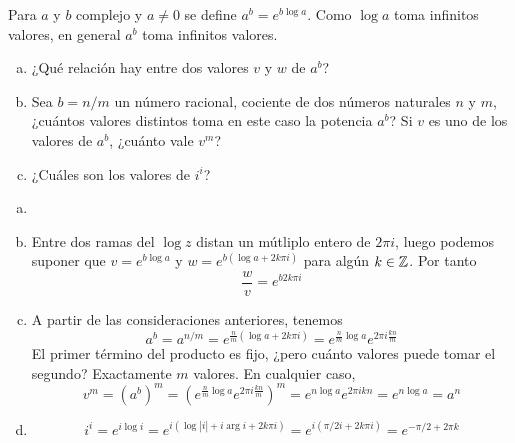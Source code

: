 \documentclass[twoside]{article}
\begin{document}
\begin{ejercicio}{4}
Para $a$ y $b$ complejo y $a\neq 0$ se define $a^b = e^{b\log a}$. Como $\log a$ toma infinitos valores, en general $a^b$ toma infinitos valores.
\begin{enumerate}[(a)]
\item ¿Qué relación hay entre dos valores $v$ y $w$ de $a^b$?
\item Sea $b=n/m$ un número racional, cociente de dos números naturales $n$ y $m$, ¿cuántos valores distintos toma en este caso la potencia $a^b$? Si $v$ es uno de los valores de $a^b$, ¿cuánto vale $v^m$?
\item ¿Cuáles son los valores de $i^i$?
\end{enumerate}
\end{ejercicio}
\begin{solucion}
\begin{enumerate}[(a)]
\item[]
\item Entre dos ramas del $\log z$ distan un mútliplo entero de $2\pi i$, luego podemos suponer que $v=e^{b\log a}$ y $w = e^{b(\log a+2k\pi i)}$ para algún $k\in \mathbb{Z}$. Por tanto
$$
\frac{w}{v} = e^{b2k\pi i}
$$
\item A partir de las consideraciones anteriores, tenemos
$$
a^b=a^{n/m}=e^{\frac{n}{m}(\log a +2k\pi i)} = e^{\frac{n}{m}\log a}e^{2\pi i\frac{kn}{m}}
$$
El primer término del producto es fijo, ¿pero cuánto valores puede tomar el segundo? Exactamente $m$ valores. En cualquier caso,
$$
v^m= (a^b)^m = \left(e^{\frac{n}{m}\log a}e^{2\pi i\frac{kn}{m}}\right)^m = e^{n\log a}e^{2\pi ikn} = e^{n\log a} = a^n
$$
\item 
$$
i^i = e^{i \log i} = e^{i(\log|i|+i\arg i +2k\pi i)}=e^{i(\pi/2 i + 2k\pi i)}= e^{-\pi/2+2\pi k}
$$
\end{enumerate}
\end{solucion}
\newpage


\begin{ejercicio}{5}
\end{ejercicio}
\begin{solucion}
\end{solucion}
\newpage
\end{document}
